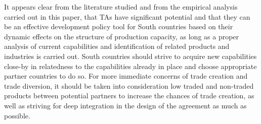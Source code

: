 It appears clear from the literature studied and from the empirical
analysis carried out in this paper, that TAs have significant potential
and that they can be an effective development policy tool for South
countries based on their dynamic effects on the structure of production
capacity, as long as a proper analysis of current capabilities and
identification of related products and industries is carried out. South
countries should strive to acquire new capabilities close-by in
relatedness to the capabilities already in place and choose appropriate
partner countries to do so. For more immediate concerns of trade
creation and trade diversion, it should be taken into consideration low
traded and non-traded products between potential partners to increase
the chances of trade creation, as well as striving for deep integration
in the design of the agreement as much as possible.